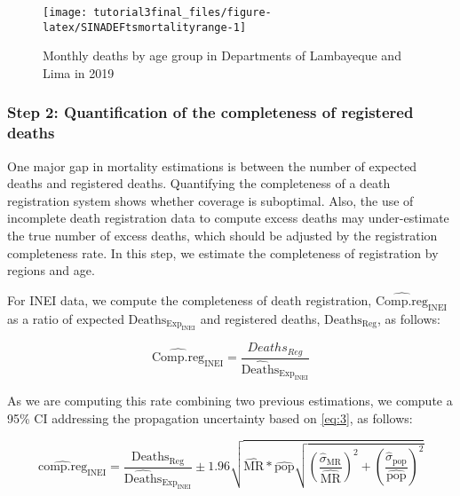 \documentclass[
]{article}
\begin{document}
\begin{figure}[H]

{\centering \texttt{[image: tutorial3final\_files/figure-latex/SINADEFtsmortalityrange-1]} 

}

\caption{Monthly deaths by age group  in Departments of Lambayeque and Lima in 2019}\label{fig:SINADEFtsmortalityrange}
\end{figure}

\hypertarget{step-2-quantification-of-the-completeness-of-registered-deaths}{%
\subsubsection{Step 2: Quantification of the completeness of registered deaths}\label{step-2-quantification-of-the-completeness-of-registered-deaths}}

One major gap in mortality estimations is between the number of expected deaths and registered deaths. Quantifying the completeness of a death registration system shows whether coverage is suboptimal. Also, the use of incomplete death registration data to compute excess deaths may under-estimate the true number of excess deaths, which should be adjusted by the registration completeness rate. In this step, we estimate the completeness of registration by regions and age.

For INEI data, we compute the completeness of death registration, \(\widehat{\text{Comp.reg}}_{\text{INEI}}\) as a ratio of expected \(\text{Deaths}_{\text{Exp}_{\text{INEI}}}\) and registered deaths, \(\text{Deaths}_\text{Reg}\), as follows:

\begin{equation}
  \label{eq:5}
  \widehat{\text{Comp.reg}}_\text{INEI}= \frac{Deaths_{Reg}}{\widehat{\text{Deaths}}_{\text{Exp}_{\text{INEI}}}}
\end{equation}

As we are computing this rate combining two previous estimations, we compute a 95\% CI addressing the propagation uncertainty based on \eqref{eq:3}, as follows:

\begin{equation}
  \label{eq:6}
    \widehat{\text{comp.reg}}_\text{INEI}= \frac{\text{Deaths}_\text{Reg}}{\widehat{\text{Deaths}}_{{\text{Exp}}_{\text{INEI}}}}\pm  1.96\sqrt{\widehat{\text{MR}}*\widehat{\text{pop}}\sqrt{(\frac{\hat{\sigma}_\text{MR}}{\widehat{\text{MR}}})^2+(\frac{\hat{\sigma}_\text{pop}}{\widehat{\text{pop}}})^2}}
\end{equation}
\end{document}
